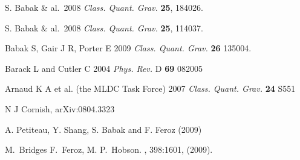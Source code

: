 \documentclass{iopart}
\begin{document}
\begin{thebibliography}{99}

S. Babak \& al.~2008 \textit{Class. Quant. Grav.} \textbf{25}, 184026.

S. Babak \& al.~2008 \textit{Class. Quant. Grav.} \textbf{25}, 114037.

 Babak S, Gair J R, Porter E 2009 \textit{Class. Quant. Grav.} \textbf{26} 135004.

 Barack L and Cutler C 2004 \textit{Phys. Rev.} D \textbf{69} 082005

 Arnaud K A et al. (the MLDC Task Force) 2007 \textit{Class. Quant. Grav.} \textbf{24} S551

 N J Cornish, arXiv:0804.3323

A. Petiteau, Y. Shang, S. Babak and  F. Feroz
 (2009)

M.~Bridges F.~Feroz, M. P.~Hobson.
, 398:1601, (2009).



\end{thebibliography}
\end{document}
